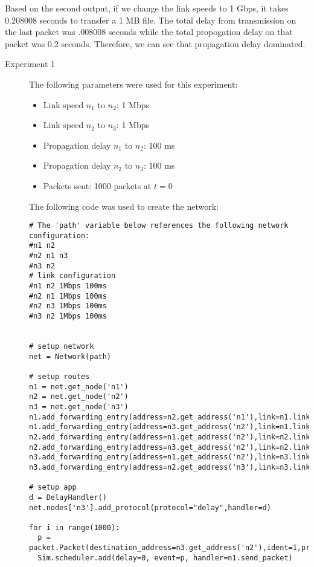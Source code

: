 \documentclass[11pt]{article}
\begin{document}
\begin{description}
\begin{description}
Based on the second output, if we change the link speeds to 1 Gbps, it takes 0.208008 seconds to transfer a 1 MB file. The total delay from transmission on the last packet was .008008 seconds while the total propogation delay on that packet was 0.2 seconds. Therefore, we can see that propagation delay dominated.


\begin{description}
\item[Experiment 1] \hfill \break
The following parameters were used for this experiment:

\begin{itemize}
\item Link speed $n_1$ to $n_2$: 1 Mbps
\item Link speed $n_2$ to $n_3$: 1 Mbps
\item Propagation delay $n_1$ to $n_2$: 100 ms
\item Propagation delay $n_2$ to $n_3$: 100 ms
\item Packets sent: 1000 packets at $t = 0$
\end{itemize}

\medskip

The following code was used to create the network:

\medskip

\begin{lstlisting}
# The 'path' variable below references the following network configuration:
#n1 n2
#n2 n1 n3
#n3 n2
# link configuration
#n1 n2 1Mbps 100ms
#n2 n1 1Mbps 100ms
#n2 n3 1Mbps 100ms
#n3 n2 1Mbps 100ms


# setup network
net = Network(path)

# setup routes
n1 = net.get_node('n1')
n2 = net.get_node('n2')
n3 = net.get_node('n3')
n1.add_forwarding_entry(address=n2.get_address('n1'),link=n1.links[0])
n1.add_forwarding_entry(address=n3.get_address('n2'),link=n1.links[0])
n2.add_forwarding_entry(address=n1.get_address('n2'),link=n2.links[0])
n2.add_forwarding_entry(address=n3.get_address('n2'),link=n2.links[1])
n3.add_forwarding_entry(address=n1.get_address('n2'),link=n3.links[0])
n3.add_forwarding_entry(address=n2.get_address('n3'),link=n3.links[0])

# setup app
d = DelayHandler()
net.nodes['n3'].add_protocol(protocol="delay",handler=d)

for i in range(1000):
  p = packet.Packet(destination_address=n3.get_address('n2'),ident=1,protocol='delay',length=1000)
  Sim.scheduler.add(delay=0, event=p, handler=n1.send_packet)
\end{lstlisting}


\end{description}
\end{description}
\end{description}
\end{document}
